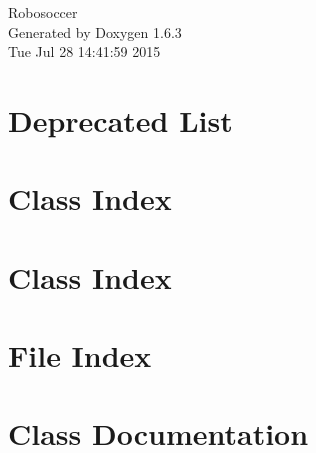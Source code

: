 \documentclass[a4paper]{book}
\begin{document}
\hypersetup{pageanchor=false}
\begin{titlepage}
\vspace*{7cm}
\begin{center}
{\Large Robosoccer }\\
\vspace*{1cm}
{\large Generated by Doxygen 1.6.3}\\
\vspace*{0.5cm}
{\small Tue Jul 28 14:41:59 2015}\\
\end{center}
\end{titlepage}
\clearemptydoublepage
{}
\tableofcontents
\clearemptydoublepage
{}
\hypersetup{pageanchor=true}
\chapter{Deprecated List}
\label{deprecated}
\hypertarget{deprecated}{}

\chapter{Class Index}

\chapter{Class Index}

\chapter{File Index}

\chapter{Class Documentation}































\end{document}

